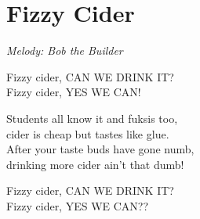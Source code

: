 \section{Fizzy Cider}
\textit{Melody: Bob the Builder}

Fizzy cider, CAN WE DRINK IT?\\
Fizzy cider, YES WE CAN!

Students all know it and fuksis too,\\
cider is cheap but tastes like glue.\\
After your taste buds have gone numb,\\
drinking more cider ain't that dumb!

Fizzy cider, CAN WE DRINK IT?\\
Fizzy cider, YES WE CAN??